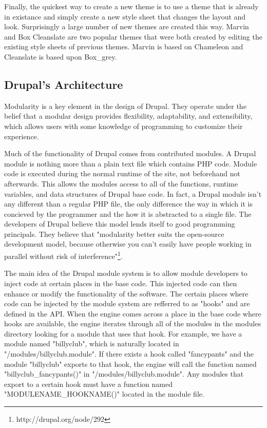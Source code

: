 \documentclass[a4paper,12pt]{report}
\begin{document}
Finally, the quickest way to create a new theme is to use a theme that is already in existance and simply create a new style sheet that changes the layout and look. 
Surprisingly a large number of new themes are created this way. 
Marvin and Box Cleanslate are two popular themes that were both created by editing the existing style sheets of previous themes. 
Marvin is based on Chameleon and Cleanslate is based upon Box\_grey.  


\subsection {Drupal's Architecture}
Modularity is a key element in the design of Drupal.
They operate under the belief that a modular design provides flexibility, adaptability, and extensibility, which allows users with some knowledge of programming to customize their experience.


Much of the functionality of Drupal comes from contributed modules. 
A Drupal module is nothing more than a plain text file which contains PHP code. 
Module code is executed during the normal runtime of the site, not beforehand not afterwards. 
This allows the modules access to all of the functions, runtime variables, and data structures of Drupal base code. 
In fact, a Drupal module isn't any different than a regular PHP file, the only difference the way in which it is concieved by the programmer and the how it is abstracted to a single file. 
The developers of Drupal believe this model lends itself to good programming principals. 
They believe that "modularity better suits the open-source development model, because otherwise you can't easily have people working in parallel without risk of interference"\footnote{http://drupal.org/node/292}. %


The main idea of the Drupal module system is to allow module developers to inject code at certain places in the base code. 
This injected code can then enhance or modify the functionality of the software. 
The certain places where code can be injected by the module system are refferred to as "hooks" and are defined in the API. 
When the engine comes across a place in the base code where hooks are available, the engine iterates through all of the modules in the modules directory looking for a module that uses that hook. 
For example, we have a module named "billyclub", which is naturally located in "/modules/billyclub.module". If there exists a hook called "fancypants" and the module "billyclub" exports to that hook, the engine will call the function named "billyclub\_fancypants()" in "/modules/billyclub.module".
Any modules that export to a certain hook must have a function named "MODULENAME\_HOOKNAME()" located in the module file. 
\end{document}
